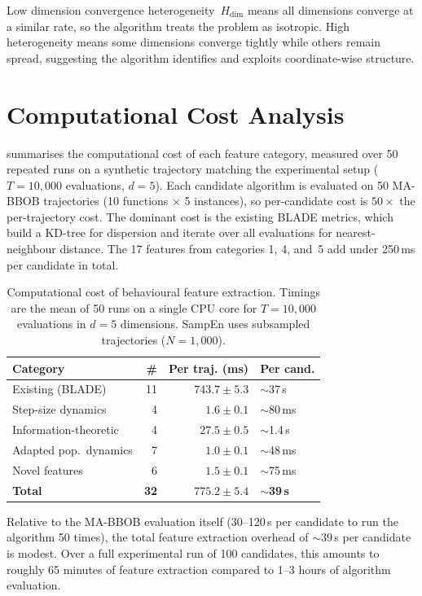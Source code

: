 Low dimension convergence heterogeneity~$H_{\mathrm{dim}}$ means all
dimensions converge at a similar rate, so the
algorithm treats the problem as isotropic.  High heterogeneity means some
dimensions converge tightly while others remain spread, suggesting the algorithm
identifies and exploits coordinate-wise structure.

\section{Computational Cost Analysis}
\label{sec:features:cost}

 summarises the computational cost of each feature
category, measured over 50 repeated runs on a synthetic trajectory matching
the experimental setup ($T = 10{,}000$ evaluations, $d = 5$).  Each candidate
algorithm is evaluated on 50 MA-BBOB trajectories (10 functions
$\times$ 5 instances), so per-candidate cost is $50\times$ the per-trajectory
cost.  The dominant cost is the existing BLADE metrics, which build a KD-tree
for dispersion and iterate over all evaluations for nearest-neighbour
distance.  The 17 features from categories 1, 4, and~5 add under 250\,ms per
candidate in total.

\begin{table}[t]
  \centering
  \caption{Computational cost of behavioural feature extraction.  Timings
    are the mean of 50 runs on a single CPU core for $T = 10{,}000$ evaluations
    in $d = 5$ dimensions.  SampEn uses subsampled trajectories ($N = 1{,}000$).}
  \label{tab:feature_cost}
  \footnotesize
  \begin{tabular}{@{}lrrl@{}}
    \toprule
    Category & \# & Per traj. (ms) & Per cand. \\
    \midrule
    Existing (BLADE)            & 11 & $743.7 \pm 5.3$   & $\sim$37\,s   \\
    Step-size dynamics          &  4 & $1.6 \pm 0.1$     & $\sim$80\,ms  \\
    Information-theoretic       &  4 & $27.5 \pm 0.5$    & $\sim$1.4\,s  \\
    Adapted pop.\ dynamics      &  7 & $1.0 \pm 0.1$     & $\sim$48\,ms  \\
    Novel features              &  6 & $1.5 \pm 0.1$     & $\sim$75\,ms  \\
    \midrule
    \textbf{Total}              & \textbf{32} & $\mathbf{775.2 \pm 5.4}$ & $\sim$\textbf{39\,s} \\
    \bottomrule
  \end{tabular}
\end{table}

Relative to the MA-BBOB evaluation itself (30--120\,s per candidate to run
the algorithm 50 times), the total feature extraction overhead of
${\sim}39$\,s per candidate is modest.  Over a full experimental run of 100
candidates, this amounts to roughly 65 minutes of feature extraction compared
to 1--3 hours of algorithm evaluation.
